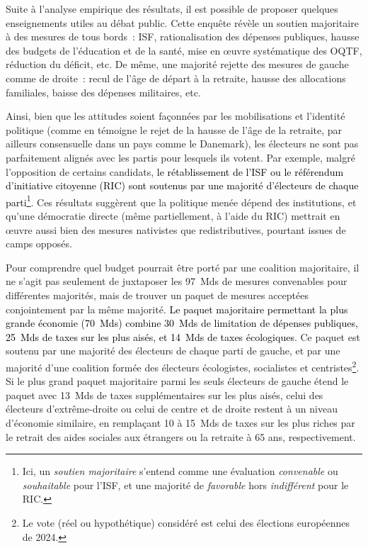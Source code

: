 \documentclass[12pt,french]{article}
\newcommand{\blue}[1]{\textcolor{black}{#1}} %
\begin{document}
Suite à l'analyse empirique des résultats, il est possible de proposer quelques enseignements utiles au débat public. 
Cette enquête révèle un soutien majoritaire à des mesures de tous bords~: ISF, rationalisation des dépenses publiques, hausse des budgets de l'éducation et de la santé, mise en œuvre systématique des OQTF, réduction du déficit, etc. De même, une majorité rejette des mesures de gauche comme de droite~: recul de l'âge de départ à la retraite, hausse des allocations familiales, baisse des dépenses militaires, etc.

Ainsi, bien que les attitudes soient façonnées par les mobilisations et l'identité politique (comme en témoigne le rejet de la hausse de l'âge de la retraite, par ailleurs consensuelle dans un pays comme le Danemark), les électeurs ne sont pas parfaitement alignés avec les partis pour lesquels ils votent. Par exemple, malgré l'opposition de certains candidats, \blue{le rétablissement de l'ISF ou le référendum d'initiative citoyenne (RIC) sont soutenus par une majorité d'électeurs de chaque parti}\footnote{Ici, un \textit{soutien majoritaire} s'entend comme une évaluation \textit{convenable} ou \textit{souhaitable} pour l'ISF, et une majorité de \textit{favorable} hors \textit{indifférent} pour le RIC.}. Ces résultats suggèrent que la politique menée dépend des institutions, et qu'une démocratie directe (même partiellement, à l'aide du RIC) mettrait en œuvre aussi bien des mesures nativistes que redistributives, pourtant issues de camps opposés. 

Pour comprendre quel budget pourrait être porté par une coalition majoritaire, il ne s'agit pas seulement de juxtaposer les 97~Mds de mesures convenables pour différentes majorités, mais de trouver un paquet de mesures acceptées conjointement par la même majorité. \blue{Le paquet majoritaire permettant la plus grande économie (70~Mds) combine 30~Mds de limitation de dépenses publiques, 25~Mds de taxes sur les plus aisés, et 14~Mds de taxes écologiques}. Ce paquet est soutenu par une majorité des électeurs de chaque parti de gauche, et par une majorité d'une coalition formée des électeurs écologistes, socialistes et centristes\footnote{Le vote (réel ou hypothétique) considéré est celui des élections européennes de 2024.}. Si le plus grand paquet majoritaire parmi les seuls électeurs de gauche étend le paquet avec 13~Mds de taxes supplémentaires sur les plus aisés, celui des électeurs d'extrême-droite ou celui de centre et de droite restent à un niveau d'économie similaire, en remplaçant 10 à 15~Mds de taxes sur les plus riches par le retrait des aides sociales aux étrangers ou la retraite à 65 ans, respectivement.  %
\end{document}
